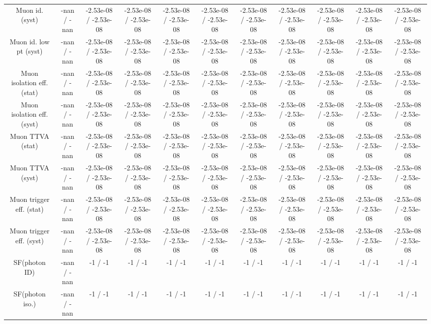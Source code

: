 \begin{table}[htbp]
\begin{center}
\begin{tabular}{|c|c|c|c|c|c|c|c|c|c|c|}
  Muon id. (syst) & -nan / -nan & -2.53e-08 / -2.53e-08 & -2.53e-08 / -2.53e-08 & -2.53e-08 / -2.53e-08 & -2.53e-08 / -2.53e-08 & -2.53e-08 / -2.53e-08 & -2.53e-08 / -2.53e-08 & -2.53e-08 / -2.53e-08 & -2.53e-08 / -2.53e-08 & -2.53e-08 / -2.53e-08 \\ 
  Muon id. low pt (syst) & -nan / -nan & -2.53e-08 / -2.53e-08 & -2.53e-08 / -2.53e-08 & -2.53e-08 / -2.53e-08 & -2.53e-08 / -2.53e-08 & -2.53e-08 / -2.53e-08 & -2.53e-08 / -2.53e-08 & -2.53e-08 / -2.53e-08 & -2.53e-08 / -2.53e-08 & -2.53e-08 / -2.53e-08 \\ 
  Muon isolation eff. (stat) & -nan / -nan & -2.53e-08 / -2.53e-08 & -2.53e-08 / -2.53e-08 & -2.53e-08 / -2.53e-08 & -2.53e-08 / -2.53e-08 & -2.53e-08 / -2.53e-08 & -2.53e-08 / -2.53e-08 & -2.53e-08 / -2.53e-08 & -2.53e-08 / -2.53e-08 & -2.53e-08 / -2.53e-08 \\ 
  Muon isolation eff. (syst) & -nan / -nan & -2.53e-08 / -2.53e-08 & -2.53e-08 / -2.53e-08 & -2.53e-08 / -2.53e-08 & -2.53e-08 / -2.53e-08 & -2.53e-08 / -2.53e-08 & -2.53e-08 / -2.53e-08 & -2.53e-08 / -2.53e-08 & -2.53e-08 / -2.53e-08 & -2.53e-08 / -2.53e-08 \\ 
  Muon TTVA (stat) & -nan / -nan & -2.53e-08 / -2.53e-08 & -2.53e-08 / -2.53e-08 & -2.53e-08 / -2.53e-08 & -2.53e-08 / -2.53e-08 & -2.53e-08 / -2.53e-08 & -2.53e-08 / -2.53e-08 & -2.53e-08 / -2.53e-08 & -2.53e-08 / -2.53e-08 & -2.53e-08 / -2.53e-08 \\ 
  Muon TTVA (syst) & -nan / -nan & -2.53e-08 / -2.53e-08 & -2.53e-08 / -2.53e-08 & -2.53e-08 / -2.53e-08 & -2.53e-08 / -2.53e-08 & -2.53e-08 / -2.53e-08 & -2.53e-08 / -2.53e-08 & -2.53e-08 / -2.53e-08 & -2.53e-08 / -2.53e-08 & -2.53e-08 / -2.53e-08 \\ 
  Muon trigger eff. (stat) & -nan / -nan & -2.53e-08 / -2.53e-08 & -2.53e-08 / -2.53e-08 & -2.53e-08 / -2.53e-08 & -2.53e-08 / -2.53e-08 & -2.53e-08 / -2.53e-08 & -2.53e-08 / -2.53e-08 & -2.53e-08 / -2.53e-08 & -2.53e-08 / -2.53e-08 & -2.53e-08 / -2.53e-08 \\ 
  Muon trigger eff. (syst) & -nan / -nan & -2.53e-08 / -2.53e-08 & -2.53e-08 / -2.53e-08 & -2.53e-08 / -2.53e-08 & -2.53e-08 / -2.53e-08 & -2.53e-08 / -2.53e-08 & -2.53e-08 / -2.53e-08 & -2.53e-08 / -2.53e-08 & -2.53e-08 / -2.53e-08 & -2.53e-08 / -2.53e-08 \\ 
  SF(photon ID) & -nan / -nan & -1 / -1 & -1 / -1 & -1 / -1 & -1 / -1 & -1 / -1 & -1 / -1 & -1 / -1 & -1 / -1 & -1 / -1 \\ 
  SF(photon iso.) & -nan / -nan & -1 / -1 & -1 / -1 & -1 / -1 & -1 / -1 & -1 / -1 & -1 / -1 & -1 / -1 & -1 / -1 & -1 / -1 \\ 

\end{tabular}
\end{center}
\end{table}
